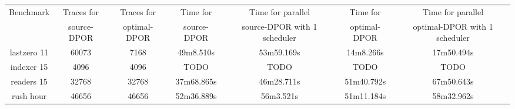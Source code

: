\begin{center}
\begin{tabular}{ |c|c|c|c|c|c|c| }
\hline
Benchmark & Traces for& Traces for & Time for& Time for parallel& Time for& Time for parallel \\
 & source-DPOR & optimal-DPOR & source-DPOR & source-DPOR with 1 scheduler & optimal-DPOR & optimal-DPOR with 1 scheduler \\
\hline \hline
lastzero 11 & 60073 & 7168 & 49m8.510s & 53m59.169s & 14m8.266s & 17m50.494s\\
\hline
indexer 15 &  4096 & 4096 & TODO & TODO & TODO & TODO\\
\hline
readers 15 &  32768 & 32768 & 37m68.865s & 46m28.711s  & 51m40.792s & 67m50.643s \\
\hline
rush hour &  46656 & 46656 & 52m36.889s &  56m3.521s & 51m11.184s &  58m32.962s \\
\hline
\end{tabular}
\end{center}
